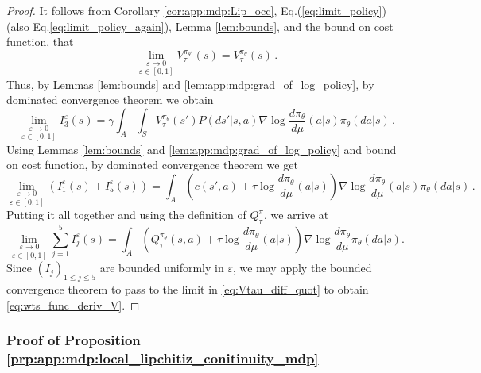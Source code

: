 \documentclass{amsart}
\theoremstyle{definition}
\begin{document}
\begin{proof}
It follows from Corollary \ref{cor:app:mdp:Lip_occ}, Eq.(\ref{eq:limit_policy}) (also Eq.\eqref{eq:limit_policy_again}), Lemma \ref{lem:bounds}, and the bound on cost function, that 
\[
\underset{\varepsilon \in [0,1]}{\lim_{\varepsilon\rightarrow 0}}V^{\pi_{\theta^{\varepsilon}}}_{\tau}(s)=V^{\pi_{\theta}}_{\tau}(s)\,.
\]
Thus, by Lemmas \ref{lem:bounds} and \ref{lem:app:mdp:grad_of_log_policy}, by dominated convergence theorem we obtain 
\[
\underset{\varepsilon \in [0,1]}{\lim_{\varepsilon\rightarrow 0}}I_3^{\varepsilon}(s)=\gamma\int_A \int_S V^{\pi_{\theta}}_{\tau}(s')P(ds'|s,a)  \nabla \log \frac{d \pi_\theta}{d \mu}(a|s)\pi_{\theta}(da|s)\,.
\]
Using Lemmas \ref{lem:bounds} and \ref{lem:app:mdp:grad_of_log_policy} and bound on cost function, by dominated convergence theorem we get
\begin{equation*}
\underset{\varepsilon \in [0,1]}{\lim_{\varepsilon\rightarrow 0}}(I_1^{\varepsilon}(s)+I_5^{\varepsilon}(s))=\int_A \left(c(s',a)+\tau\log\frac{d\pi_{\theta}}{d\mu}(a|s)\right)\nabla \log \frac{d \pi_\theta}{d \mu}(a|s)\pi_{\theta}(da|s)\,.
\end{equation*}
Putting it all together and using the definition of $Q^{\pi}_\tau$, we arrive at
\[
\underset{\varepsilon \in [0,1]}{\lim_{\varepsilon\rightarrow 0}}\sum_{j=1}^5 I_j^{\varepsilon}(s)=\int_A \left(Q_{\tau}^{\pi_{\theta}}(s,a)+\tau\log\frac{d\pi_{\theta}}{d\mu}(a|s)\right)\nabla \log \frac{d \pi_\theta}{d \mu}\pi_{\theta}(da|s).
\]
Since $(I_j)_{1\le j\le 5}$ are bounded uniformly in $\varepsilon$, we may apply the bounded convergence theorem to pass to the limit in \eqref{eq:Vtau_diff_quot} to obtain \eqref{eq:wts_func_deriv_V}. 
\end{proof}

\subsubsection{Proof of Proposition \ref{prp:app:mdp:local_lipchitiz_conitinuity_mdp}}
\label{sec:proof_local_lip}
\end{document}
